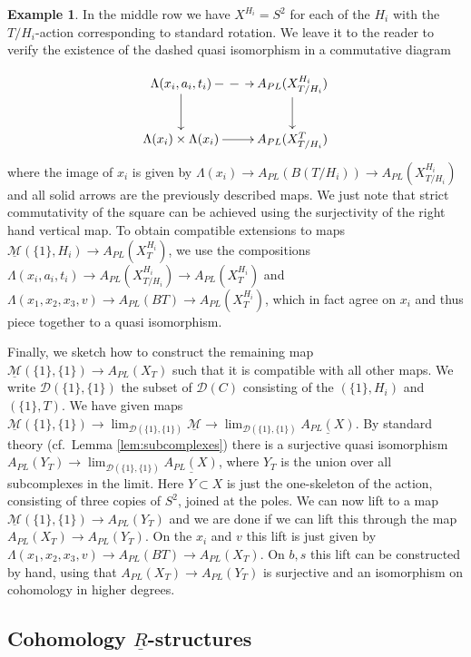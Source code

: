 \documentclass[12pt,a4paper]{article}
\theoremstyle{definition}
\newtheorem{ex}[thm]{Example}
\begin{document}
\begin{ex}
In the middle row we have $X^{H_i}=S^2$ for each of the $H_i$ with the $T/H_i$-action corresponding to standard rotation. We leave it to the reader to verify the existence of the dashed quasi isomorphism in a commutative diagram

\[\xymatrix{
\Lambda(x_i,a_i,t_i)\ar@{-->}[r]\ar[d] & A_{PL}(X_{T/H_i}^{H_i})\ar[d]\\
\Lambda(x_i)\times \Lambda(x_i)\ar[r] & A_{PL}(X^T_{T/H_i})
}
\]
where the image of $x_i$ is given by $\Lambda(x_i)\rightarrow A_{PL}(B(T/H_i))\rightarrow A_{PL}(X^{H_i}_{T/H_i})$ and all solid arrows are the previously described maps. We just note that strict commutativity of the square can be achieved using the surjectivity of the right hand vertical map. To obtain compatible extensions to maps $\underline{\mathcal{M}}(\{1\},H_i)\rightarrow A_{PL}(X^{H_i}_T)$, we use the compositions $\Lambda(x_i,a_i,t_i)\rightarrow A_{PL}(X^{H_i}_{T/H_i})\rightarrow A_{PL}(X^{H_i}_T)$ and $\Lambda(x_1,x_2,x_3,v)\rightarrow A_{PL}(BT)\rightarrow A_{PL}(X^{H_i}_T)$, which in fact agree on $x_i$ and thus piece together to a quasi isomorphism.

Finally, we sketch how to construct the remaining map $\underline{\mathcal{M}}(\{1\},\{1\})\rightarrow A_{PL}(X_T)$ such that it is compatible with all other maps. We write $\mathcal{D}(\{1\},\{1\})$ the subset of $\mathcal{D}(C)$ consisting of the $(\{1\},H_i)$ and $(\{1\},T)$. We have given maps $\underline{\mathcal{M}}(\{1\},\{1\})\rightarrow \lim_{\mathcal{D}(\{1\},\{1\})} \underline{\mathcal{M}}\rightarrow \lim_{\mathcal{D}(\{1\},\{1\})} \underline{A_{PL}(X)}$. By standard theory (cf.\ Lemma \ref{lem:subcomplexes}) there is a surjective quasi isomorphism $A_{PL}(Y_T)\rightarrow \lim_{\mathcal{D}(\{1\},\{1\})} \underline{A_{PL}(X)}$, where $Y_T$ is the union over all subcomplexes in the limit. Here $Y\subset X$ is just the one-skeleton of the action, consisting of three copies of $S^2$, joined at the poles. We can now lift to a map $\underline{\mathcal{M}}(\{1\},\{1\})\rightarrow A_{PL}(Y_T)$ and we are done if we can lift this through the map $A_{PL}(X_T)\rightarrow A_{PL}(Y_T)$. On the $x_i$ and $v$ this lift is just given by $\Lambda(x_1,x_2,x_3,v)\rightarrow A_{PL}(BT)\rightarrow A_{PL}(X_T)$. On $b,s$ this lift can be constructed by hand, using that $A_{PL}(X_T)\rightarrow A_{PL}(Y_T)$ is surjective and an isomorphism on cohomology in higher degrees.
\end{ex}

\subsection{Cohomology $\underline{R}$-structures}
\end{document}
